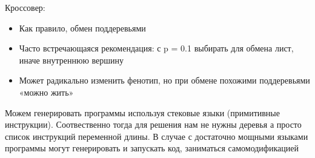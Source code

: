 Кроссовер:
\begin{itemize}
	\item Как правило, обмен поддеревьями
	\item Часто встречающаяся рекомендация: с p = 0.1 выбирать для обмена лист, иначе внутреннюю вершину
	\item Может радикально изменить фенотип, но при обмене похожими поддеревьями «можно жить»
\end{itemize}
Можем генерировать программы используя стековые языки (примитивные инструкции). 
Соотвественно тогда для решения нам не нужны деревья а просто список инструкций переменной длины. 
В случае с достаточно мощными языками программы могут генерировать и запускать код, заниматься самомодификацией
